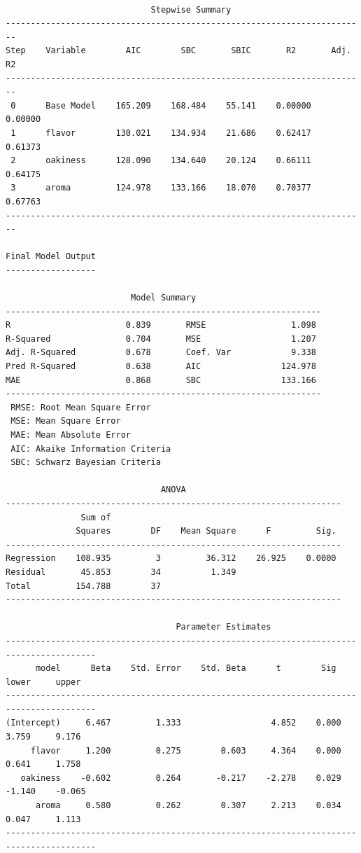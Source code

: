\documentclass[
  letterpaper,
  DIV=11,
  numbers=noendperiod]{scrreprt}
\begin{document}
\begin{verbatim}

                             Stepwise Summary                             
------------------------------------------------------------------------
Step    Variable        AIC        SBC       SBIC       R2       Adj. R2 
------------------------------------------------------------------------
 0      Base Model    165.209    168.484    55.141    0.00000    0.00000 
 1      flavor        130.021    134.934    21.686    0.62417    0.61373 
 2      oakiness      128.090    134.640    20.124    0.66111    0.64175 
 3      aroma         124.978    133.166    18.070    0.70377    0.67763 
------------------------------------------------------------------------

Final Model Output 
------------------

                         Model Summary                          
---------------------------------------------------------------
R                       0.839       RMSE                 1.098 
R-Squared               0.704       MSE                  1.207 
Adj. R-Squared          0.678       Coef. Var            9.338 
Pred R-Squared          0.638       AIC                124.978 
MAE                     0.868       SBC                133.166 
---------------------------------------------------------------
 RMSE: Root Mean Square Error 
 MSE: Mean Square Error 
 MAE: Mean Absolute Error 
 AIC: Akaike Information Criteria 
 SBC: Schwarz Bayesian Criteria 

                               ANOVA                                
-------------------------------------------------------------------
               Sum of                                              
              Squares        DF    Mean Square      F         Sig. 
-------------------------------------------------------------------
Regression    108.935         3         36.312    26.925    0.0000 
Residual       45.853        34          1.349                     
Total         154.788        37                                    
-------------------------------------------------------------------

                                  Parameter Estimates                                    
----------------------------------------------------------------------------------------
      model      Beta    Std. Error    Std. Beta      t        Sig      lower     upper 
----------------------------------------------------------------------------------------
(Intercept)     6.467         1.333                  4.852    0.000     3.759     9.176 
     flavor     1.200         0.275        0.603     4.364    0.000     0.641     1.758 
   oakiness    -0.602         0.264       -0.217    -2.278    0.029    -1.140    -0.065 
      aroma     0.580         0.262        0.307     2.213    0.034     0.047     1.113 
----------------------------------------------------------------------------------------
\end{verbatim}
\end{document}
